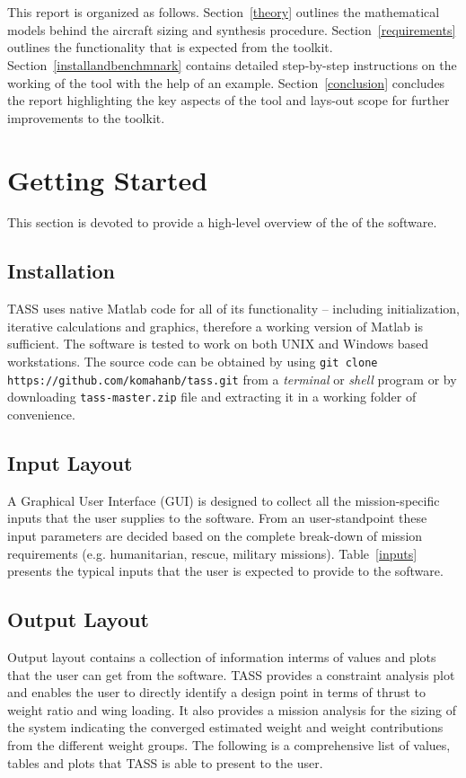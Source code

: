 \documentclass[pdftex,11pt,letter]{article}
\begin{document}
\\\\
This report is organized as follows. Section~\ref{theory} outlines the mathematical models behind the aircraft sizing and synthesis procedure. Section~\ref{requirements} outlines the functionality that is expected from the toolkit. Section~\ref{installandbenchmnark} contains detailed step-by-step instructions on the working of the tool with the help of an example. Section~\ref{conclusion} concludes the report highlighting the key aspects of the tool and lays-out scope for further improvements to the toolkit. 


\section{Getting Started}\label{layout}
This section is devoted to provide a high-level overview of the of the software.

\subsection{Installation}
TASS uses native Matlab code for all of its functionality -- including initialization, iterative calculations and graphics, therefore a working version of Matlab\cite{MATLAB} is sufficient. The software is tested to work on both UNIX and Windows based workstations. The source code can be obtained by using \texttt{git clone https://github.com/komahanb/tass.git} from a \textit{terminal} or \textit{shell} program or by downloading \texttt{tass-master.zip} file and extracting it in a working folder of convenience. 

\subsection{Input Layout}
A Graphical User Interface (GUI) is designed to collect all the mission-specific inputs that the user supplies to the software. From an user-standpoint these input parameters are decided based on the complete break-down of mission requirements (e.g. humanitarian, rescue, military missions). Table~\ref{inputs} presents the typical inputs that the user is expected to provide to the software. 

\subsection{Output Layout}
Output layout contains a collection of information interms of values and plots that the user can get from the software.  TASS provides  a constraint analysis plot and enables the user to directly identify a design point in terms of thrust to weight ratio and wing loading. It also provides a mission analysis for the sizing of the system indicating the converged estimated weight and weight contributions from the different weight groups. The following is a comprehensive list of values, tables and plots that TASS is able to present to the user.
\end{document}
